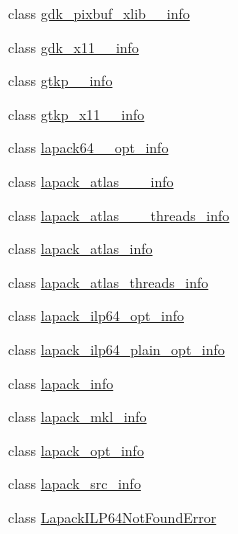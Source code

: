 \begin{DoxyCompactItemize}
\item 
class \hyperlink{classnumpy_1_1distutils_1_1system__info_1_1gdk__pixbuf__xlib__2__info}{gdk\+\_\+pixbuf\+\_\+xlib\+\_\+\_\+info}
\item 
class \hyperlink{classnumpy_1_1distutils_1_1system__info_1_1gdk__x11__2__info}{gdk\+\_\+x11\+\_\+\_\+info}
\item 
class \hyperlink{classnumpy_1_1distutils_1_1system__info_1_1gtkp__2__info}{gtkp\+\_\+\_\+info}
\item 
class \hyperlink{classnumpy_1_1distutils_1_1system__info_1_1gtkp__x11__2__info}{gtkp\+\_\+x11\+\_\+\_\+info}
\item 
class \hyperlink{classnumpy_1_1distutils_1_1system__info_1_1lapack64____opt__info}{lapack64\+\_\+\+\_\+opt\+\_\+info}
\item 
class \hyperlink{classnumpy_1_1distutils_1_1system__info_1_1lapack__atlas__3__10__info}{lapack\+\_\+atlas\+\_\+\_\+\_\+info}
\item 
class \hyperlink{classnumpy_1_1distutils_1_1system__info_1_1lapack__atlas__3__10__threads__info}{lapack\+\_\+atlas\+\_\+\_\+\_\+threads\+\_\+info}
\item 
class \hyperlink{classnumpy_1_1distutils_1_1system__info_1_1lapack__atlas__info}{lapack\+\_\+atlas\+\_\+info}
\item 
class \hyperlink{classnumpy_1_1distutils_1_1system__info_1_1lapack__atlas__threads__info}{lapack\+\_\+atlas\+\_\+threads\+\_\+info}
\item 
class \hyperlink{classnumpy_1_1distutils_1_1system__info_1_1lapack__ilp64__opt__info}{lapack\+\_\+ilp64\+\_\+opt\+\_\+info}
\item 
class \hyperlink{classnumpy_1_1distutils_1_1system__info_1_1lapack__ilp64__plain__opt__info}{lapack\+\_\+ilp64\+\_\+plain\+\_\+opt\+\_\+info}
\item 
class \hyperlink{classnumpy_1_1distutils_1_1system__info_1_1lapack__info}{lapack\+\_\+info}
\item 
class \hyperlink{classnumpy_1_1distutils_1_1system__info_1_1lapack__mkl__info}{lapack\+\_\+mkl\+\_\+info}
\item 
class \hyperlink{classnumpy_1_1distutils_1_1system__info_1_1lapack__opt__info}{lapack\+\_\+opt\+\_\+info}
\item 
class \hyperlink{classnumpy_1_1distutils_1_1system__info_1_1lapack__src__info}{lapack\+\_\+src\+\_\+info}
\item 
class \hyperlink{classnumpy_1_1distutils_1_1system__info_1_1LapackILP64NotFoundError}{Lapack\+I\+L\+P64\+Not\+Found\+Error}

\end{DoxyCompactItemize}
